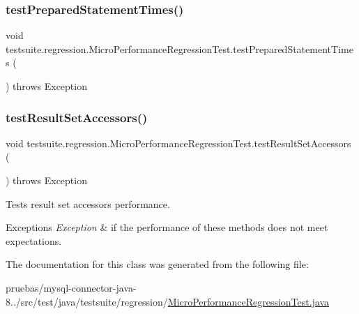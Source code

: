 \mbox{\label{classtestsuite_1_1regression_1_1_micro_performance_regression_test_a075ad2c74ac9703c0b94555dcf77cfb7}} 
\subsubsection{\texorpdfstring{test\+Prepared\+Statement\+Times()}{testPreparedStatementTimes()}}
{\footnotesize\ttfamily void testsuite.\+regression.\+Micro\+Performance\+Regression\+Test.\+test\+Prepared\+Statement\+Times (\begin{DoxyParamCaption}{ }\end{DoxyParamCaption}) throws Exception}

\mbox{\label{classtestsuite_1_1regression_1_1_micro_performance_regression_test_a1fa02a07cb865e21f5debd2b6cf58782}} 
\subsubsection{\texorpdfstring{test\+Result\+Set\+Accessors()}{testResultSetAccessors()}}
{\footnotesize\ttfamily void testsuite.\+regression.\+Micro\+Performance\+Regression\+Test.\+test\+Result\+Set\+Accessors (\begin{DoxyParamCaption}{ }\end{DoxyParamCaption}) throws Exception}

Tests result set accessors performance.


\begin{DoxyExceptions}{Exceptions}
{\em Exception} & if the performance of these methods does not meet expectations. \\
\hline
\end{DoxyExceptions}


The documentation for this class was generated from the following file\+:\begin{DoxyCompactItemize}
\item 
pruebas/mysql-\/connector-\/java-\/8../src/test/java/testsuite/regression/\mbox{\hyperlink{_micro_performance_regression_test_8java}{Micro\+Performance\+Regression\+Test.\+java}}\end{DoxyCompactItemize}

